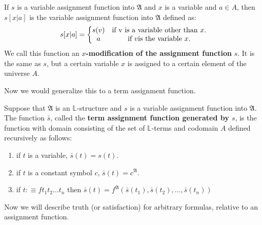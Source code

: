 \documentclass[9pt,a4paper, twocolumn]{article}
\newcommand{\curveL}{\mathbb{L} }
\newcommand{\curveA}{\mathfrak{A} }
\begin{document}
            \begin{define}
                If $s$ is a variable assignment function into $\curveA$ and $x$ is a variable and $a \in A$, then $s[x|a]$ is the variable assignment function into $\curveA$ defined as:
                \begin{equation}
                    s[x|a] = \left\{ \begin{matrix} s(v) & \text{if } $v$ \text{ is a variable other than } x.\\ a & \text{if } v \text{is the variable }x.\end{matrix}\right.
                \end{equation}
                We call this function an $x$\textbf{-modification of the assignment function} $s$. It is the same as $s$, but a certain variable $x$ is assigned to a certain element of the universe $A$.
            \end{define}
            Now we would generalize this to a term assignment function.
            \begin{define}
                Suppose that $\curveA$ is an $\curveL$-structure and $s$ is a variable assignment function into $\curveA$. The function $\bar s$, called the \textbf{term assignment function generated by $s$}, is the function with domain consisting of the set of $\curveL$-terms and codomain $A$ defined recursively as follows:
                \begin{enumerate}
                    \item if $t$ is a variable, $\bar s(t) = s(t)$.
                    \item if $t$ is a constant symbol $c$, $\bar s(t) = c^\curveA$.
                    \item if $t:\equiv ft_1t_2\dots t_n$ then $\bar s(t) = f^\curveA(\bar s(t_1),\bar s(t_2),\dots, \bar s(t_n))$
                \end{enumerate}
            \end{define}
            Now we will describe truth (or satisfaction) for arbitrary formulas, relative to an assignment function. 
\end{document}
